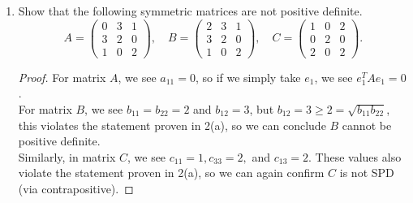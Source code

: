 \documentclass[11pt]{article}
\newcommand{\n}{\vspace{0.3cm}}
\begin{document}
\begin{enumerate}
	\item Show that the following symmetric matrices are not positive definite.
	      \[
		      A = \begin{pmatrix} 0 & 3 & 1 \\ 3 & 2 & 0 \\ 1 & 0 & 2 \end{pmatrix}, \quad
		      B = \begin{pmatrix} 2 & 3 & 1 \\ 3 & 2 & 0 \\ 1 & 0 & 2 \end{pmatrix}, \quad
		      C = \begin{pmatrix} 1 & 0 & 2 \\ 0 & 2 & 0 \\ 2 & 0 & 2 \end{pmatrix}.
	      \]
	      \begin{proof}
		      For matrix \(A\), we see \(a_{11} = 0\), so if we simply take \(e_1\), we see \(e_1^T A e_1 = 0\). \n\\
		      For matrix \(B\), we see \(b_{11} = b_{22} = 2\) and \(b_{12} = 3\), but \(b_{12} = 3 \geq 2 = \sqrt{b_{11}b_{22}}\), this violates the statement proven in 2(a), so we can conclude \(B\) cannot be positive definite. \n\\
		      Similarly, in matrix \(C\), we see \(c_{11} = 1,  c_{33} = 2,\) and \(c_{13} = 2\).  These values also violate the statement proven in 2(a), so we can again confirm \(C\) is not SPD (via contrapositive).
	      \end{proof}


\end{enumerate}
\end{document}
